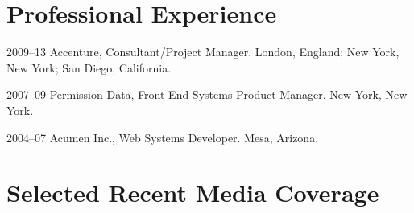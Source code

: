 \documentclass{academiccv}
\begin{document}
\section*{Professional Experience}

\begin{tablist}
	
\item[2009--13] \tab Accenture, Consultant/Project Manager. London, England; New York, New York; San Diego, California.

\item[2007--09] \tab Permission Data, Front-End Systems Product Manager. New York, New York.

\item[2004--07] \tab Acumen Inc., Web Systems Developer. Mesa, Arizona.

\end{tablist}



\section*{Selected Recent Media Coverage}
\end{document}
